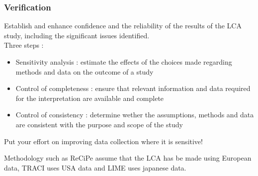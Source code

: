 \documentclass[../main.tex]{subfiles}
\begin{document}
\subsubsection{Verification}
Establish and enhance confidence and the reliability of the results of the LCA study, including the significant issues identified.\\
Three steps : \begin{itemize}
    \item Sensitivity analysis : estimate the effects of the choices made regarding methods and data on the outcome of a study
    \item Control of completeness : ensure that relevant information and data required for the interpretation are available and complete
    \item Control of consistency : determine wether the assumptions, methods and data are consistent with the purpose and scope of the study
\end{itemize}
Put your effort on improving data collection where it is sensitive! 

\warning Methodology such as ReCiPe assume that the LCA has be made using European data, TRACI uses USA data and LIME uses japanese data.
\end{document}

